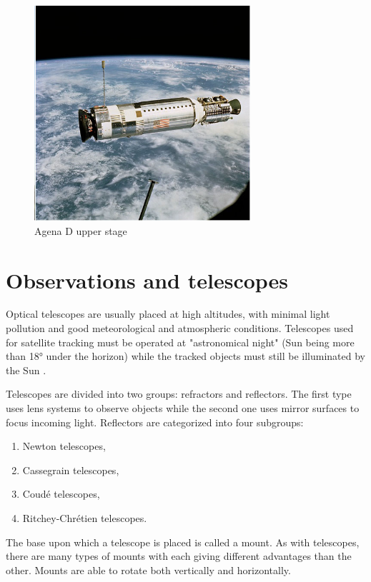 \begin{figure}[H]
\centering
  \includegraphics[width=8cm]{images/upperstage}
  \caption{Agena D upper stage}
  \label{fig:upperstage}
\end{figure}
	
\pagebreak


\section{Observations and telescopes}\label{sec:observations_telescopes}

Optical telescopes are usually placed at high altitudes, with minimal light pollution and good meteorological and atmospheric conditions. Telescopes used for satellite tracking must be operated at "astronomical night" (Sun being more than 18° under the horizon) while the tracked objects must still be illuminated by the Sun \citep{klinkrad2006space}.

	Telescopes are divided into two groups: refractors and reflectors. The first type uses lens systems to observe objects while the second one uses mirror surfaces to focus incoming light. Reflectors are categorized into four subgroups:
	
\begin{enumerate}
	\item Newton telescopes,
	\item Cassegrain telescopes,
	\item Coudé telescopes,
	\item Ritchey-Chrétien telescopes.
\end{enumerate}
	
	The base upon which a telescope is placed is called a mount. As with telescopes, there are many types of mounts with each giving different advantages than the other. Mounts are able to rotate both vertically and horizontally.
	
